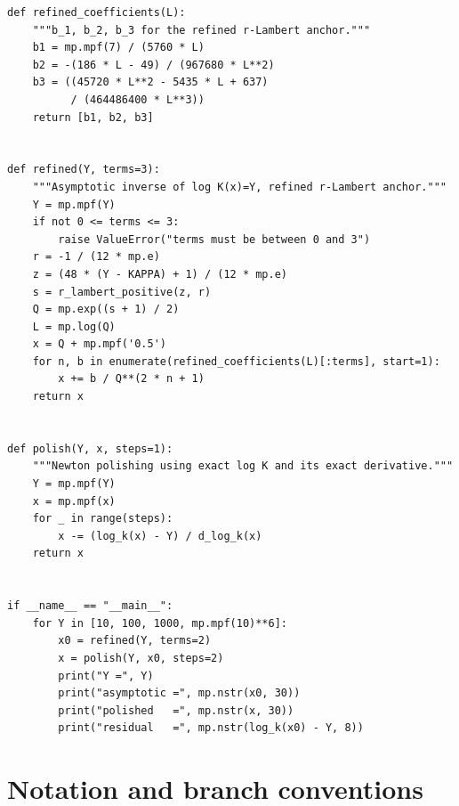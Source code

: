 \documentclass[11pt,oneside]{article}
\theoremstyle{plain}
\theoremstyle{definition}
\theoremstyle{remark}
\begin{document}
\begin{lstlisting}
def refined_coefficients(L):
    """b_1, b_2, b_3 for the refined r-Lambert anchor."""
    b1 = mp.mpf(7) / (5760 * L)
    b2 = -(186 * L - 49) / (967680 * L**2)
    b3 = ((45720 * L**2 - 5435 * L + 637)
          / (464486400 * L**3))
    return [b1, b2, b3]


def refined(Y, terms=3):
    """Asymptotic inverse of log K(x)=Y, refined r-Lambert anchor."""
    Y = mp.mpf(Y)
    if not 0 <= terms <= 3:
        raise ValueError("terms must be between 0 and 3")
    r = -1 / (12 * mp.e)
    z = (48 * (Y - KAPPA) + 1) / (12 * mp.e)
    s = r_lambert_positive(z, r)
    Q = mp.exp((s + 1) / 2)
    L = mp.log(Q)
    x = Q + mp.mpf('0.5')
    for n, b in enumerate(refined_coefficients(L)[:terms], start=1):
        x += b / Q**(2 * n + 1)
    return x


def polish(Y, x, steps=1):
    """Newton polishing using exact log K and its exact derivative."""
    Y = mp.mpf(Y)
    x = mp.mpf(x)
    for _ in range(steps):
        x -= (log_k(x) - Y) / d_log_k(x)
    return x


if __name__ == "__main__":
    for Y in [10, 100, 1000, mp.mpf(10)**6]:
        x0 = refined(Y, terms=2)
        x = polish(Y, x0, steps=2)
        print("Y =", Y)
        print("asymptotic =", mp.nstr(x0, 30))
        print("polished   =", mp.nstr(x, 30))
        print("residual   =", mp.nstr(log_k(x0) - Y, 8))
\end{lstlisting}

\section{Notation and branch conventions}
\label{app:notation}
\end{document}
